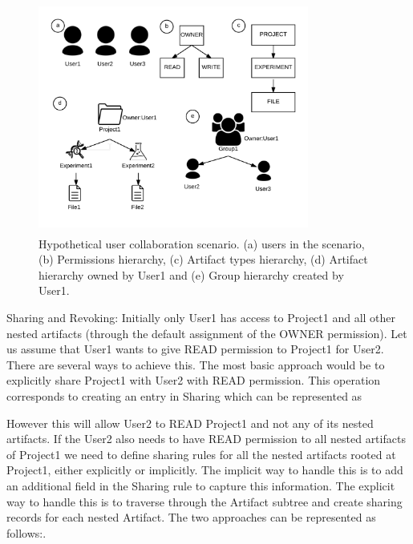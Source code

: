 \documentclass[sigconf]{acmart}
\begin{document}
\begin{figure}
\includegraphics[height=3in, width=3.5in]{figures/usage-scenarios.pdf}
\caption{Hypothetical user collaboration scenario. (a) users in the scenario, (b) Permissions hierarchy, (c) Artifact types hierarchy, (d) Artifact hierarchy owned by User1 and (e) Group hierarchy created by User1.}
\end{figure}

Sharing and Revoking: Initially only User1 has access to Project1 and all other nested artifacts (through the default assignment of the OWNER permission). Let us assume that User1 wants to give READ permission to Project1 for User2.  There are several ways to achieve this. The most basic approach would be to explicitly share Project1 with User2 with READ permission. This operation corresponds to creating an entry in Sharing which can be represented as 

However this will allow User2 to READ Project1 and not any of its nested artifacts. If the User2 also needs to have READ permission to all nested artifacts of Project1 we need to define sharing rules for all the nested artifacts rooted at Project1, either explicitly or implicitly. The implicit way to handle this is to add an additional field in the Sharing rule to capture this information. The explicit way to handle this is to traverse through the Artifact subtree and create sharing records for each nested Artifact. The two approaches can be represented as follows:.
\end{document}
